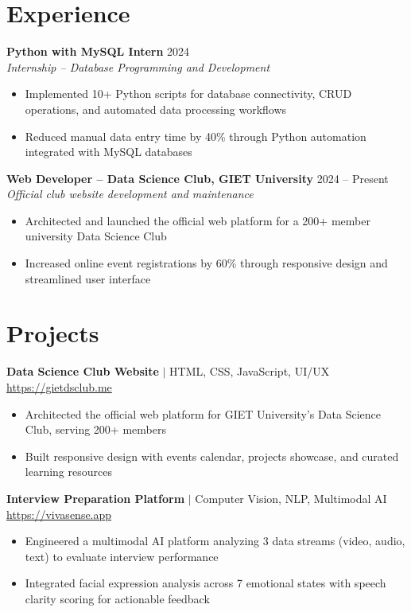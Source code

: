 \documentclass[a4paper,10pt]{article}
\begin{document}
\section{Experience}

\textbf{Python with MySQL Intern} \hfill 2024 \\
\textit{Internship -- Database Programming and Development}
\begin{itemize}[leftmargin=12pt, nosep]
    \item Implemented 10+ Python scripts for database connectivity, CRUD operations, and automated data processing workflows
    \item Reduced manual data entry time by 40\% through Python automation integrated with MySQL databases
\end{itemize}

\vspace{2pt}
\textbf{Web Developer -- Data Science Club, GIET University} \hfill 2024 -- Present \\
\textit{Official club website development and maintenance}
\begin{itemize}[leftmargin=12pt, nosep]
    \item Architected and launched the official web platform for a 200+ member university Data Science Club
    \item Increased online event registrations by 60\% through responsive design and streamlined user interface
\end{itemize}

\section{Projects}

\textbf{Data Science Club Website} $|$ HTML, CSS, JavaScript, UI/UX \hfill \href{https://www.gietdsclub.me/}{https://gietdsclub.me}
\begin{itemize}[leftmargin=12pt, nosep]
    \item Architected the official web platform for GIET University's Data Science Club, serving 200+ members
    \item Built responsive design with events calendar, projects showcase, and curated learning resources
\end{itemize}

\vspace{2pt}
\textbf{Interview Preparation Platform} $|$ Computer Vision, NLP, Multimodal AI \hfill \href{https://www.vivasense.app/}{https://vivasense.app}
\begin{itemize}[leftmargin=12pt, nosep]
    \item Engineered a multimodal AI platform analyzing 3 data streams (video, audio, text) to evaluate interview performance
    \item Integrated facial expression analysis across 7 emotional states with speech clarity scoring for actionable feedback
\end{itemize}
\end{document}
